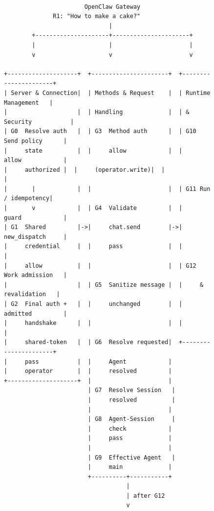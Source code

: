 \begin{figure}[p]
\centering
\begingroup
\makeatletter
\def\verbatim@font{\ttfamily\fontsize{4.2}{4.4}\selectfont}
\makeatother

\begin{verbatim}

                       OpenClaw Gateway
              R1: "How to make a cake?"
                              |
        +---------------------+----------------------+
        |                     |                      |
        v                     v                      v

+--------------------+  +----------------------+  +----------------------+
| Server & Connection|  | Methods & Request    |  | Runtime Management   |
|                    |  | Handling             |  | & Security           |
| G0  Resolve auth   |  | G3  Method auth      |  | G10 Send policy      |
|     state          |  |     allow            |  |     allow            |
|     authorized |  |     (operator.write)|  |                      |
|       |            |  |                      |  | G11 Run / idempotency|
|       v            |  | G4  Validate         |  |     guard            |
| G1  Shared         |->|     chat.send        |->|     new_dispatch     |
|     credential     |  |     pass             |  |                      |
|     allow          |  |                      |  | G12 Work admission   |
|                    |  | G5  Sanitize message |  |     & revalidation   |
| G2  Final auth +   |  |     unchanged        |  |     admitted         |
|     handshake      |  |                      |  |                      |
|     shared-token   |  | G6  Resolve requested|  +----------------------+
|     pass           |  |     Agent            |
|     operator       |  |     resolved         |
+--------------------+  |                      |
                        | G7  Resolve Session   |
                        |     resolved          |
                        |                      |
                        | G8  Agent-Session     |
                        |     check            |
                        |     pass             |
                        |                      |
                        | G9  Effective Agent   |
                        |     main             |
                        +----------+-----------+
                                   |
                                   | after G12
                                   v


\end{verbatim}
\end{figure}
